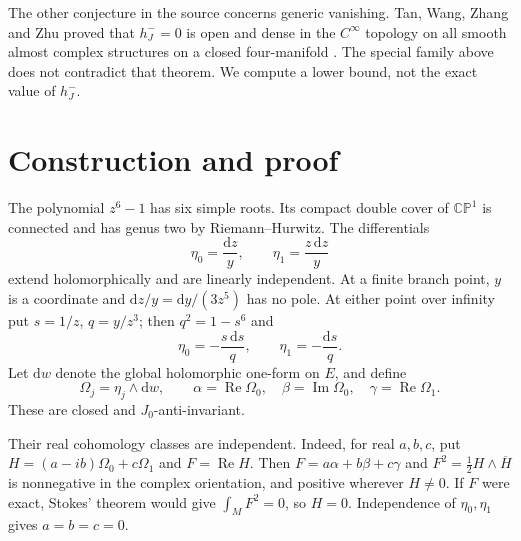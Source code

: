 \documentclass[11pt]{article}
\newcommand{\dd}{\mathrm d}
\newcommand{\Rea}{\operatorname{Re}}
\newcommand{\Ima}{\operatorname{Im}}
\begin{document}
The other conjecture in the source concerns generic vanishing. Tan, Wang,
Zhang and Zhu proved that $h_J^-=0$ is open and dense in the $C^\infty$
topology on all smooth almost complex structures on a closed four-manifold
\cite[Theorem 1.1]{TWZZ}. The special family above does not contradict
that theorem. We compute a lower bound, not the exact value of $h_J^-$.

\section{Construction and proof}
The polynomial $z^6-1$ has six simple roots. Its compact double cover of
$\mathbb{CP}^1$ is connected and has genus two by Riemann--Hurwitz.
The differentials
\[
 \eta_0=\frac{\dd z}{y},\qquad \eta_1=\frac{z\,\dd z}{y}
\]
extend holomorphically and are linearly independent. At a finite branch
point, $y$ is a coordinate and $\dd z/y=\dd y/(3z^5)$ has no pole.
At either point over infinity put $s=1/z$, $q=y/z^3$; then
$q^2=1-s^6$ and
\[
 \eta_0=-\frac{s\,\dd s}{q},\qquad \eta_1=-\frac{\dd s}{q}.
\]
Let $\dd w$ denote the global holomorphic one-form on $E$, and define
\[
 \Omega_j=\eta_j\wedge\dd w,\qquad
 \alpha=\Rea\Omega_0,\quad \beta=\Ima\Omega_0,\quad
 \gamma=\Rea\Omega_1 .
\]
These are closed and $J_0$-anti-invariant.

Their real cohomology classes are independent. Indeed, for real $a,b,c$,
put $H=(a-ib)\Omega_0+c\Omega_1$ and $F=\Rea H$.
Then $F=a\alpha+b\beta+c\gamma$ and
$F^2=\tfrac12 H\wedge\overline H$ is nonnegative in the complex orientation,
and positive wherever $H\ne0$. If $F$ were exact, Stokes' theorem would give
$\int_M F^2=0$, so $H=0$. Independence of $\eta_0,\eta_1$ gives $a=b=c=0$.
\end{document}
